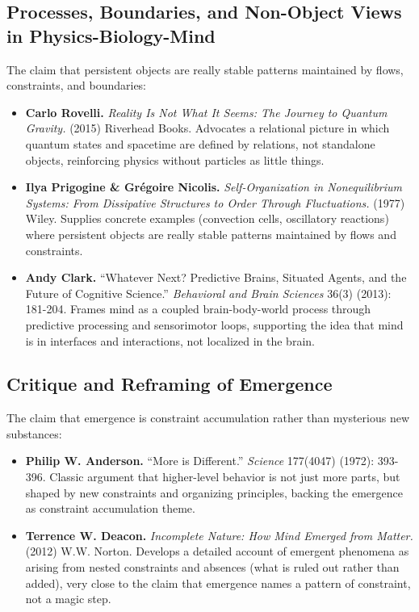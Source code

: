\documentclass[
  openright]{book}
\begin{document}
\subsection{Processes, Boundaries, and Non-Object Views in
Physics-Biology-Mind}\label{processes-boundaries-and-non-object-views-in-physics-biology-mind}

The claim that persistent objects are really stable patterns maintained
by flows, constraints, and boundaries:

\begin{itemize}
\item
  \textbf{Carlo Rovelli.} \emph{Reality Is Not What It Seems: The
  Journey to Quantum Gravity.} (2015) Riverhead Books. Advocates a
  relational picture in which quantum states and spacetime are defined
  by relations, not standalone objects, reinforcing physics without
  particles as little things.
\item
  \textbf{Ilya Prigogine \& Grégoire Nicolis.} \emph{Self-Organization
  in Nonequilibrium Systems: From Dissipative Structures to Order
  Through Fluctuations.} (1977) Wiley. Supplies concrete examples
  (convection cells, oscillatory reactions) where persistent objects are
  really stable patterns maintained by flows and constraints.
\item
  \textbf{Andy Clark.} ``Whatever Next? Predictive Brains, Situated
  Agents, and the Future of Cognitive Science.'' \emph{Behavioral and
  Brain Sciences} 36(3) (2013): 181-204. Frames mind as a coupled
  brain-body-world process through predictive processing and
  sensorimotor loops, supporting the idea that mind is in interfaces and
  interactions, not localized in the brain.
\end{itemize}

\subsection{Critique and Reframing of
Emergence}\label{critique-and-reframing-of-emergence}

The claim that emergence is constraint accumulation rather than
mysterious new substances:

\begin{itemize}
\item
  \textbf{Philip W. Anderson.} ``More is Different.'' \emph{Science}
  177(4047) (1972): 393-396. Classic argument that higher-level behavior
  is not just more parts, but shaped by new constraints and organizing
  principles, backing the emergence as constraint accumulation theme.
\item
  \textbf{Terrence W. Deacon.} \emph{Incomplete Nature: How Mind Emerged
  from Matter.} (2012) W.W. Norton. Develops a detailed account of
  emergent phenomena as arising from nested constraints and absences
  (what is ruled out rather than added), very close to the claim that
  emergence names a pattern of constraint, not a magic step.
\end{itemize}
\end{document}
